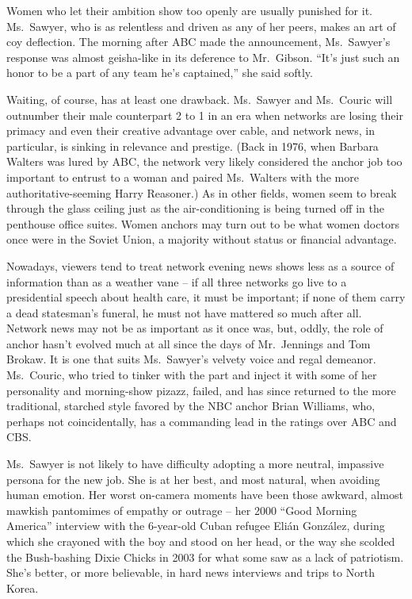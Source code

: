 ﻿\documentclass[12pt]{article}
\begin{document}
Women who let their ambition show too openly are usually punished for it. Ms.~Sawyer, who is as
relentless and driven as any of her peers, makes an art of coy deflection. The morning after ABC
made the announcement, Ms.~Sawyer's response was almost geisha-like in its deference to Mr.~Gibson.
``It's just such an honor to be a part of any team he's captained,'' she said softly.

Waiting, of course, has at least one drawback. Ms.~Sawyer and Ms.~Couric will outnumber their male
counterpart 2 to 1 in an era when networks are losing their primacy and even their creative
advantage over cable, and network news, in particular, is sinking in relevance and prestige. (Back
in 1976, when Barbara Walters was lured by ABC, the network very likely considered the anchor job
too important to entrust to a woman and paired Ms.~Walters with the more authoritative-seeming Harry
Reasoner.) As in other fields, women seem to break through the glass ceiling just as the
air-conditioning is being turned off in the penthouse office suites. Women anchors may turn out to
be what women doctors once were in the Soviet Union, a majority without status or financial
advantage.

Nowadays, viewers tend to treat network evening news shows less as a source of information than as a
weather vane -- if all three networks go live to a presidential speech about health care, it must be
important; if none of them carry a dead statesman's funeral, he must not have mattered so much after
all. Network news may not be as important as it once was, but, oddly, the role of anchor hasn't
evolved much at all since the days of Mr.~Jennings and Tom Brokaw. It is one that suits Ms.~Sawyer's
velvety voice and regal demeanor. Ms.~Couric, who tried to tinker with the part and inject it with
some of her personality and morning-show pizazz, failed, and has since returned to the more
traditional, starched style favored by the NBC anchor Brian Williams, who, perhaps not
coincidentally, has a commanding lead in the ratings over ABC and CBS.

Ms.~Sawyer is not likely to have difficulty adopting a more neutral, impassive persona for the new
job. She is at her best, and most natural, when avoiding human emotion. Her worst on-camera moments
have been those awkward, almost mawkish pantomimes of empathy or outrage -- her 2000 ``Good Morning
America'' interview with the 6-year-old Cuban refugee Eli\'an Gonz\'alez, during which she crayoned
with the boy and stood on her head, or the way she scolded the Bush-bashing Dixie Chicks in 2003 for
what some saw as a lack of patriotism. She's better, or more believable, in hard news interviews and
trips to North Korea.
\end{document}

